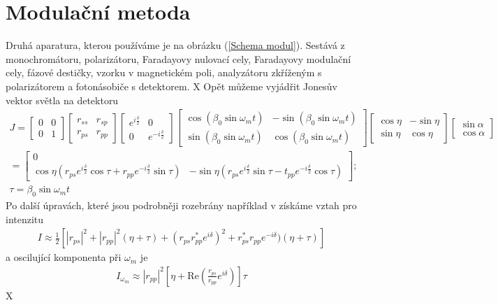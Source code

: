 \section{Modulační metoda}
Druhá aparatura, kterou používáme je na obrázku (\ref{Schema modul}). Sestává z monochromátoru, polarizátoru, Faradayovy nulovací cely, Faradayovy modulační cely, fázové destičky, vzorku v magnetickém poli, analyzátoru zkříženým s polarizátorem a fotonásobiče s detektorem. 
X %
Opět můžeme vyjádřit Jonesův vektor světla na detektoru
\begin{eqnarray}
J=\begin{bmatrix}0&0\\0&1\end{bmatrix}
\begin{bmatrix}r_{ss}&r_{sp}\\r_{ps}& r_{pp}\end{bmatrix}
\begin{bmatrix}e^{i\frac{\delta}{2}}&0\\0&e^{-i\frac{\delta}{2}}\end{bmatrix}
\begin{bmatrix}\cos(\beta_0\sin\omega_mt) & -\sin(\beta_0\sin\omega_mt) \\ \sin(\beta_0\sin\omega_mt)&\cos(\beta_0\sin\omega_mt)\end{bmatrix}
\begin{bmatrix}\cos\eta&-\sin\eta\\\sin\eta&\cos\eta\end{bmatrix}
\begin{bmatrix}\sin\alpha\\\cos\alpha\end{bmatrix} \\
=\begin{bmatrix}0\\\cos\eta(r_{ps}e^{i\frac{\delta}{2}}\cos\tau+r_{pp}e^{-i\frac{\delta}{2}}\sin\tau)& -\sin\eta(r_{ps}e^{i\frac{\delta}{2}}\sin\tau-t_{pp}e^{-i\frac{\delta}{2}}\cos\tau)\end{bmatrix};\\ \tau = \beta_0\sin\omega_mt
\end{eqnarray}
Po další úpravách, které jsou podrobněji rozebrány například v \cite{Nyvlt} získáme vztah pro intenzitu
\begin{eqnarray}
I\approx\frac{1}{2}\left[|r_{ps}|^2+|r_{pp}|^2(\eta+\tau)+(r_{ps}r^*_{pp}e^{i\delta})^2+r^*_{ps}r_{pp}e^{-i\delta})(\eta+\tau)\right]
\end{eqnarray}
a oscilující komponenta při $\omega_m$ je
\begin{eqnarray}
I_{\omega_m}\approx|r_{pp}|^2\left[\eta+\mbox{Re}\left(\frac{r_{ps}}{r_{pp}}e^{i\delta}\right)\right]\tau
\end{eqnarray}
X %

